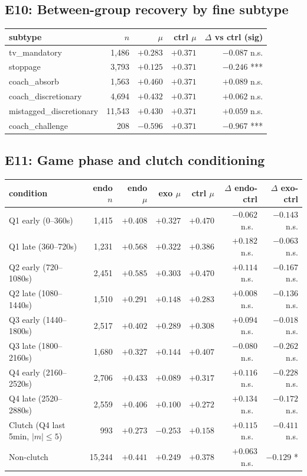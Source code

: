 \documentclass[twoside,11pt]{article}
\begin{document}
\subsection*{E10: Between-group recovery by fine subtype}

\begin{tabular}{lrrrr}
		\toprule
		subtype & $n$ & $\mu$ & ctrl $\mu$ & $\Delta$ vs ctrl (sig) \\
		\midrule
		tv\_mandatory            & 1{,}486  & $+0.283$ & $+0.371$ & $-0.087$ n.s. \\
		stoppage                 & 3{,}793  & $+0.125$ & $+0.371$ & $-0.246$ ***  \\
		coach\_absorb            & 1{,}563  & $+0.460$ & $+0.371$ & $+0.089$ n.s. \\
		coach\_discretionary     & 4{,}694  & $+0.432$ & $+0.371$ & $+0.062$ n.s. \\
		mistagged\_discretionary & 11{,}543 & $+0.430$ & $+0.371$ & $+0.059$ n.s. \\
		coach\_challenge         & 208      & $-0.596$ & $+0.371$ & $-0.967$ ***  \\
		\bottomrule
\end{tabular}

\subsection*{E11: Game phase and clutch conditioning}

\begin{tabular}{lrrrrrr}
		\toprule
		condition & endo $n$ & endo $\mu$ & exo $\mu$ & ctrl $\mu$ & $\Delta$ endo-ctrl & $\Delta$ exo-ctrl \\
		\midrule
		Q1 early (0--360s)    & 1{,}415 & $+0.408$ & $+0.327$ & $+0.470$ & $-0.062$ n.s.\ & $-0.143$ n.s. \\
		Q1 late  (360--720s)  & 1{,}231 & $+0.568$ & $+0.322$ & $+0.386$ & $+0.182$ n.s.\ & $-0.063$ n.s. \\
		Q2 early (720--1080s) & 2{,}451 & $+0.585$ & $+0.303$ & $+0.470$ & $+0.114$ n.s.\ & $-0.167$ n.s. \\
		Q2 late  (1080--1440s)& 1{,}510 & $+0.291$ & $+0.148$ & $+0.283$ & $+0.008$ n.s.\ & $-0.136$ n.s. \\
		Q3 early (1440--1800s)& 2{,}517 & $+0.402$ & $+0.289$ & $+0.308$ & $+0.094$ n.s.\ & $-0.018$ n.s. \\
		Q3 late  (1800--2160s)& 1{,}680 & $+0.327$ & $+0.144$ & $+0.407$ & $-0.080$ n.s.\ & $-0.262$ n.s. \\
		Q4 early (2160--2520s)& 2{,}706 & $+0.433$ & $+0.089$ & $+0.317$ & $+0.116$ n.s.\ & $-0.228$ n.s. \\
		Q4 late  (2520--2880s)& 2{,}559 & $+0.406$ & $+0.100$ & $+0.272$ & $+0.134$ n.s.\ & $-0.172$ n.s. \\
		\midrule
		Clutch (Q4 last 5min, $|m|\leq 5$) & 993     & $+0.273$ & $-0.253$ & $+0.158$ & $+0.115$ n.s.\ & $-0.411$ n.s. \\
		Non-clutch                          & 15{,}244 & $+0.441$ & $+0.249$ & $+0.378$ & $+0.063$ n.s.\ & $-0.129$ *    \\
		\bottomrule
\end{tabular}
\end{document}
